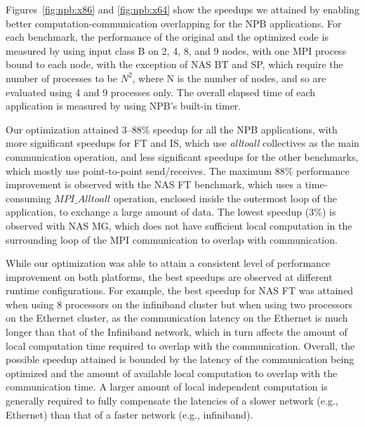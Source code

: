 Figures~\ref{fig:npb:x86} and \ref{fig:npb:x64} show the speedups we
attained by enabling better computation-communication overlapping for
the NPB applications.  For each benchmark, the
performance of the original and the optimized code is
measured by using input class B on 2, 4, 8, and 9 nodes, with one MPI
process bound to each node, with the exception of NAS BT and SP, which
require the number of processes to be $N^2$, where N is the number of nodes, and so are
evaluated using 4 and 9 processes only.  The overall elapsed time of
each application is measured by using NPB's built-in timer. 

Our optimization attained 3--88\% speedup for all the NPB applications, 
with more significant speedups for FT and IS, which 
use {\em alltoall} collectives as the main communication operation, 
and less significant speedups for the other benchmarks, which mostly use point-to-point send/receives.  
The maximum 88\% performance improvement is observed with the NAS FT
benchmark, which uses a time-consuming $MPI\_Alltoall$ operation,
enclosed inside the outermost loop of the application, to exchange a
large amount of data.  The lowest speedup (3\%) is observed with NAS
MG, which does not have sufficient local computation in the
surrounding loop of the MPI communication to overlap with
communication. 


While our optimization was able to attain a consistent level of performance improvement on both platforms, 
the best speedups are observed at different runtime configurations. 
For example, the best speedup for NAS FT was attained when using 8 processors on the infiniband cluster
but when using two processors on the Ethernet cluster, as the communication latency on the Ethernet is much longer than 
that of the Infiniband network, which in turn affects the amount of local computation time required to overlap with the communication.
Overall,  the possible speedup attained is bounded by the latency of the communication being optimized and the amount of available
local computation to overlap with the communication time. A larger amount of local independent computation is generally required to fully compensate the latencies of a slower network (e.g., Ethernet) than that of a faster network (e.g., infiniband).
